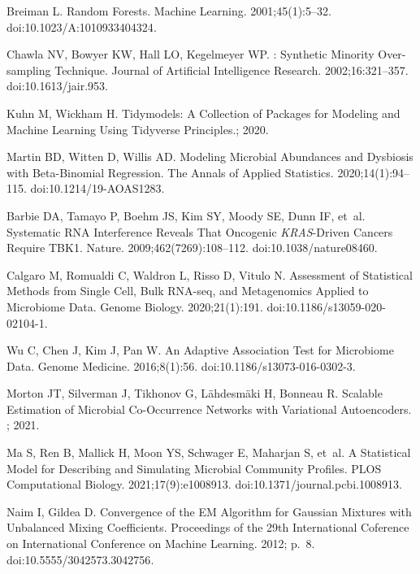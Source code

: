 \documentclass[10pt,letterpaper]{article}
\begin{document}
\begin{thebibliography}{10}
Breiman L.
\newblock Random {{Forests}}.
\newblock Machine Learning. 2001;45(1):5--32.
\newblock doi:{10.1023/A:1010933404324}.

Chawla NV, Bowyer KW, Hall LO, Kegelmeyer WP.
: {{Synthetic Minority Over-sampling Technique}}.
\newblock Journal of Artificial Intelligence Research. 2002;16:321--357.
\newblock doi:{10.1613/jair.953}.

Kuhn M, Wickham H. Tidymodels: A Collection of Packages for Modeling and
  Machine Learning Using Tidyverse Principles.; 2020.

Martin BD, Witten D, Willis AD.
\newblock Modeling Microbial Abundances and Dysbiosis with Beta-Binomial
  Regression.
\newblock The Annals of Applied Statistics. 2020;14(1):94--115.
\newblock doi:{10.1214/19-AOAS1283}.

Barbie DA, Tamayo P, Boehm JS, Kim SY, Moody SE, Dunn IF, et~al.
\newblock Systematic {{RNA}} Interference Reveals That Oncogenic
  {{{\emph{KRAS}}}}-Driven Cancers Require {{TBK1}}.
\newblock Nature. 2009;462(7269):108--112.
\newblock doi:{10.1038/nature08460}.

Calgaro M, Romualdi C, Waldron L, Risso D, Vitulo N.
\newblock Assessment of Statistical Methods from Single Cell, Bulk {{RNA-seq}},
  and Metagenomics Applied to Microbiome Data.
\newblock Genome Biology. 2020;21(1):191.
\newblock doi:{10.1186/s13059-020-02104-1}.

Wu C, Chen J, Kim J, Pan W.
\newblock An Adaptive Association Test for Microbiome Data.
\newblock Genome Medicine. 2016;8(1):56.
\newblock doi:{10.1186/s13073-016-0302-3}.

Morton JT, Silverman J, Tikhonov G, L{\"a}hdesm{\"a}ki H, Bonneau R.
\newblock Scalable Estimation of Microbial Co-Occurrence Networks with
  {{Variational Autoencoders}}.
; 2021.

Ma S, Ren B, Mallick H, Moon YS, Schwager E, Maharjan S, et~al.
\newblock A Statistical Model for Describing and Simulating Microbial Community
  Profiles.
\newblock PLOS Computational Biology. 2021;17(9):e1008913.
\newblock doi:{10.1371/journal.pcbi.1008913}.

Naim I, Gildea D.
\newblock Convergence of the {{EM Algorithm}} for {{Gaussian Mixtures}} with
  {{Unbalanced Mixing Coefficients}}.
\newblock Proceedings of the 29th International Coference on International
  Conference on Machine Learning. 2012; p.~8.
\newblock doi:{10.5555/3042573.3042756}.


\end{thebibliography}
\end{document}
